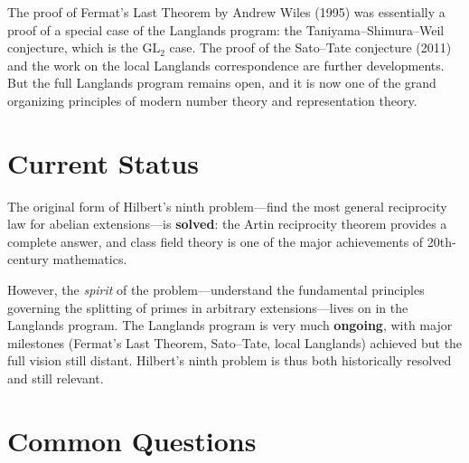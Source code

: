 The proof of Fermat's Last Theorem by Andrew Wiles (1995) was essentially a proof of a special case of the Langlands program: the Taniyama--Shimura--Weil conjecture, which is the $\mathrm{GL}_2$ case. The proof of the Sato--Tate conjecture (2011) and the work on the local Langlands correspondence are further developments. But the full Langlands program remains open, and it is now one of the grand organizing principles of modern number theory and representation theory.

\section{Current Status}

\begin{solvedbox}
The original form of Hilbert's ninth problem---find the most general reciprocity law for abelian extensions---is \textbf{solved}: the Artin reciprocity theorem provides a complete answer, and class field theory is one of the major achievements of 20th-century mathematics.

However, the \emph{spirit} of the problem---understand the fundamental principles governing the splitting of primes in arbitrary extensions---lives on in the Langlands program. The Langlands program is very much \textbf{ongoing}, with major milestones (Fermat's Last Theorem, Sato--Tate, local Langlands) achieved but the full vision still distant. Hilbert's ninth problem is thus both historically resolved and still relevant.
\end{solvedbox}

\section*{Common Questions}

